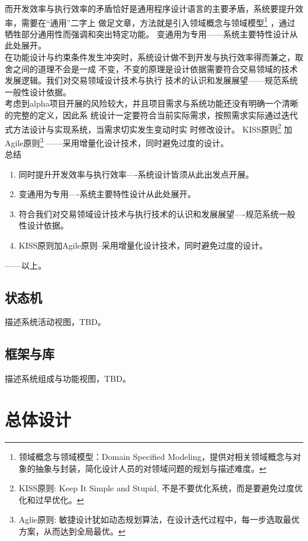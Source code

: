 而开发效率与执行效率的矛盾恰好是通用程序设计语言的主要矛盾，系统要提升效率，需要在“通用”二字上
做足文章，方法就是引入领域概念与领域模型\footnote{领域概念与领域模型：Domain Specified
Modeling，提供对相关领域概念与对象的抽象与封装，简化设计人员的对领域问题的规划与描述难度。}
，通过牺牲部分通用性而强调和突出特定功能。
变通用为专用——系统主要特性设计从此处展开。\\

在功能设计与约束条件发生冲突时，系统设计做不到开发与执行效率得而兼之，取舍之间的道理不会是一成
不变，不变的原理是设计依据需要符合交易领域的技术发展逻辑。我们对交易领域设计技术与执行
技术的认识和发展展望——规范系统一般性设计依据。\\

考虑到alpha项目开展的风险较大，并且项目需求与系统功能还没有明确一个清晰的完整的定义，因此系
统设计一定要符合当前实际需求，按照需求实际通过迭代式方法设计与实现系统，当需求切实发生变动时实
时修改设计。
KISS原则\footnote{KISS原则: Keep It Simple and Stupid, 不是不要优化系统，而是要避免过度优
化和过早优化。}
加Agile原则\footnote{Aglie原则: 敏捷设计犹如动态规划算法，在设计迭代过程中，每一步选取最优
方案，从而达到全局最优。}
——采用增量化设计技术，同时避免过度的设计。 \\


\large{总结}\normalsize{}
\begin{enumerate}
\item 同时提升开发效率与执行效率----系统设计皆须从此出发点开展。
\item 变通用为专用----系统主要特性设计从此处展开。
\item 符合我们对交易领域设计技术与执行技术的认识和发展展望----规范系统一般性设计依据。
\item KISS原则加Agile原则--采用增量化设计技术，同时避免过度的设计。
\end{enumerate}

——以上。


\section{状态机}

描述系统活动视图，TBD。

\section{框架与库}
描述系统组成与功能视图，TBD。

\chapter{总体设计}

